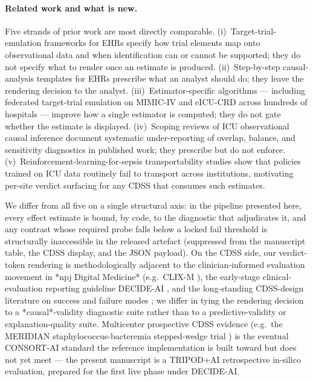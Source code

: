 \documentclass[11pt,a4paper]{article}
\begin{document}
\paragraph{Related work and what is new.} Five strands of prior work are most directly comparable. (i)~Target-trial-emulation frameworks for EHRs \cite{hernan2016target,wang2026operational} specify how trial elements map onto observational data and when identification can or cannot be supported; they do not specify what to render once an estimate is produced. (ii)~Step-by-step causal-analysis templates for EHRs \cite{doutreligne2024stepbystep} prescribe what an analyst should do; they leave the rendering decision to the analyst. (iii)~Estimator-specific algorithms --- including federated target-trial emulation on MIMIC-IV and eICU-CRD across hundreds of hospitals \cite{sun2025federated} --- improve how a single estimator is computed; they do not gate whether the estimate is displayed. (iv)~Scoping reviews of ICU observational causal inference \cite{allen2023scoping} document systematic under-reporting of overlap, balance, and sensitivity diagnostics in published work; they prescribe but do not enforce. (v)~Reinforcement-learning-for-sepsis transportability studies \cite{wornow2025transportability} show that policies trained on ICU data routinely fail to transport across institutions, motivating per-site verdict surfacing for any CDSS that consumes such estimates.

We differ from all five on a single structural axis: in the pipeline presented here, every effect estimate is bound, by code, to the diagnostic that adjudicates it, and any contrast whose required probe falls below a locked fail threshold is structurally inaccessible in the released artefact (suppressed from the manuscript table, the CDSS display, and the JSON payload). On the CDSS side, our verdict-token rendering is methodologically adjacent to the clinician-informed evaluation movement in *npj Digital Medicine* (e.g.\ CLIX-M \cite{clixm2025}), the early-stage clinical-evaluation reporting guideline DECIDE-AI \cite{decideai2022}, and the long-standing CDSS-design literature on success and failure modes \cite{sutton2020cdss}; we differ in tying the rendering decision to a *causal*-validity diagnostic suite rather than to a predictive-validity or explanation-quality suite. Multicenter prospective CDSS evidence (e.g.\ the MERIDIAN staphylococcus-bacteremia stepped-wedge trial \cite{meridian2025}) is the eventual CONSORT-AI \cite{consortai2020} standard the reference implementation is built toward but does not yet meet --- the present manuscript is a TRIPOD+AI retrospective in-silico evaluation, prepared for the first live phase under DECIDE-AI.
\end{document}
